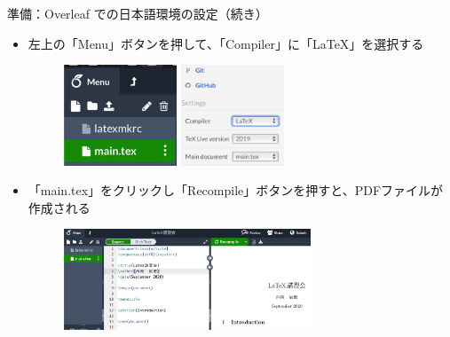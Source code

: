 \documentclass[dvipdfmx]{beamer}
\begin{document}
\begin{frame}{準備：Overleaf での日本語環境の設定（続き）}
\begin{itemize}
    \item 左上の「Menu」ボタンを押して、「Compiler」に「LaTeX」を選択する
    \begin{figure}
        \centering
        \includegraphics[height=3cm]{./figures/Menu.pdf}\qquad
        \includegraphics[height=3cm]{./figures/Compiler.pdf}
    \end{figure}
    \item 「main.tex」をクリックし「Recompile」ボタンを押すと、PDFファイルが作成される
    \begin{figure}
        \centering
        \includegraphics[height=3cm]{./figures/fig_preview.pdf}
    \end{figure}
\end{itemize}
\end{frame}
\end{document}
